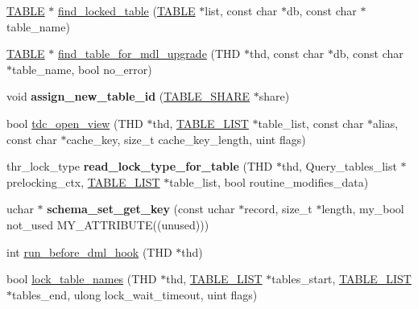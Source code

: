 \begin{DoxyCompactItemize}
\mbox{\hyperlink{structTABLE}{T\+A\+B\+LE}} $\ast$ \mbox{\hyperlink{group__Data__Dictionary_ga4458592b1c4d9ed293e5b2033349c3fb}{find\+\_\+locked\+\_\+table}} (\mbox{\hyperlink{structTABLE}{T\+A\+B\+LE}} $\ast$list, const char $\ast$db, const char $\ast$table\+\_\+name)
\item 
\mbox{\hyperlink{structTABLE}{T\+A\+B\+LE}} $\ast$ \mbox{\hyperlink{group__Data__Dictionary_ga8692f5ebd7f6483f1dcc576eb2346f52}{find\+\_\+table\+\_\+for\+\_\+mdl\+\_\+upgrade}} (T\+HD $\ast$thd, const char $\ast$db, const char $\ast$table\+\_\+name, bool no\+\_\+error)
\item 
\mbox{\label{group__Data__Dictionary_ga098cb47bbc8bbdb790fcf28c253ab2b6}} 
void {\bfseries assign\+\_\+new\+\_\+table\+\_\+id} (\mbox{\hyperlink{structTABLE__SHARE}{T\+A\+B\+L\+E\+\_\+\+S\+H\+A\+RE}} $\ast$share)
\item 
bool \mbox{\hyperlink{group__Data__Dictionary_ga917237a2e99cef2eb34e64095d79fb1a}{tdc\+\_\+open\+\_\+view}} (T\+HD $\ast$thd, \mbox{\hyperlink{structTABLE__LIST}{T\+A\+B\+L\+E\+\_\+\+L\+I\+ST}} $\ast$table\+\_\+list, const char $\ast$alias, const char $\ast$cache\+\_\+key, size\+\_\+t cache\+\_\+key\+\_\+length, uint flags)
\item 
\mbox{\label{group__Data__Dictionary_ga24fe4cc1a004bb6b5f07556a182f945b}} 
thr\+\_\+lock\+\_\+type {\bfseries read\+\_\+lock\+\_\+type\+\_\+for\+\_\+table} (T\+HD $\ast$thd, Query\+\_\+tables\+\_\+list $\ast$prelocking\+\_\+ctx, \mbox{\hyperlink{structTABLE__LIST}{T\+A\+B\+L\+E\+\_\+\+L\+I\+ST}} $\ast$table\+\_\+list, bool routine\+\_\+modifies\+\_\+data)
\item 
\mbox{\label{group__Data__Dictionary_ga9b858a3ae42dbb6ac5cc1809c9ec68b5}} 
uchar $\ast$ {\bfseries schema\+\_\+set\+\_\+get\+\_\+key} (const uchar $\ast$record, size\+\_\+t $\ast$length, my\+\_\+bool not\+\_\+used M\+Y\+\_\+\+A\+T\+T\+R\+I\+B\+U\+TE((unused)))
\item 
int \mbox{\hyperlink{group__Data__Dictionary_gaed504cf321c7fd98175f80785f6be954}{run\+\_\+before\+\_\+dml\+\_\+hook}} (T\+HD $\ast$thd)
\item 
bool \mbox{\hyperlink{group__Data__Dictionary_gae06de7ce22001b035ca61edf2a3dea09}{lock\+\_\+table\+\_\+names}} (T\+HD $\ast$thd, \mbox{\hyperlink{structTABLE__LIST}{T\+A\+B\+L\+E\+\_\+\+L\+I\+ST}} $\ast$tables\+\_\+start, \mbox{\hyperlink{structTABLE__LIST}{T\+A\+B\+L\+E\+\_\+\+L\+I\+ST}} $\ast$tables\+\_\+end, ulong lock\+\_\+wait\+\_\+timeout, uint flags)

\end{DoxyCompactItemize}
